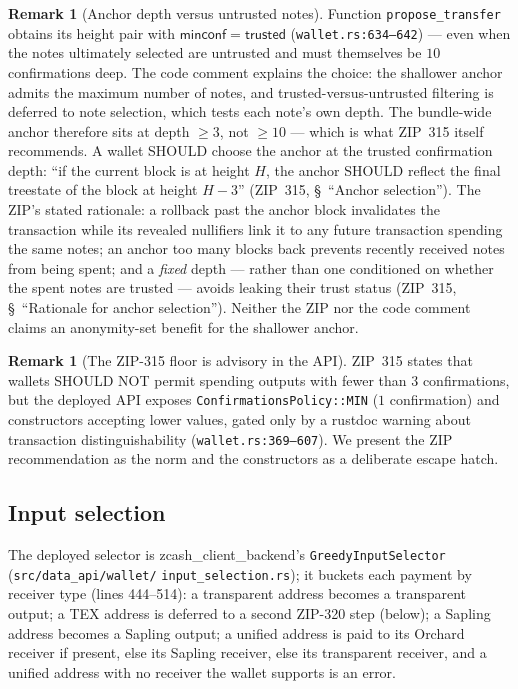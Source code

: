 \documentclass[11pt,a4paper]{article}
\theoremstyle{definition}
\newtheorem{remark}[theorem]{Remark}
\begin{document}
\begin{remark}[Anchor depth versus untrusted notes]\label{rem:anchor-depth}
Function \texttt{propose\_transfer} obtains its height pair with
$\mathsf{minconf} = \mathsf{trusted}$
(\texttt{wallet.rs:634--642}) --- even when the notes ultimately selected are
untrusted and must themselves be $10$ confirmations deep. The code comment
explains the choice: the shallower anchor admits the maximum number of notes,
and trusted-versus-untrusted filtering is deferred to note selection, which
tests each note's own depth. The bundle-wide anchor therefore sits at depth
$\ge 3$, not $\ge 10$ --- which is what ZIP~315 itself recommends. A wallet
SHOULD choose the anchor at the trusted confirmation depth: ``if the
current block is at height $H$, the anchor SHOULD reflect the final
treestate of the block at height $H-3$'' (ZIP~315, \S~``Anchor
selection''). The ZIP's stated rationale: a rollback past the anchor
block invalidates the transaction while its revealed nullifiers link it
to any future transaction spending the same notes; an anchor too many
blocks back prevents recently received notes from being spent; and a
\emph{fixed} depth --- rather than one conditioned on whether the spent
notes are trusted --- avoids leaking their trust status (ZIP~315,
\S~``Rationale for anchor selection''). Neither the ZIP nor the code
comment claims an anonymity-set benefit for the shallower anchor.
\end{remark}

\begin{remark}[The ZIP-315 floor is advisory in the API]\label{rem:zip315-min}
ZIP~315 states that wallets SHOULD NOT permit spending outputs with fewer
than $3$ confirmations, but the deployed API exposes
\texttt{ConfirmationsPolicy::MIN} ($1$ confirmation) and constructors
accepting lower values, gated only by a rustdoc warning about transaction
distinguishability (\texttt{wallet.rs:369--607}). We present the ZIP
recommendation as the norm and the constructors as a deliberate escape
hatch.
\end{remark}

\subsection{Input selection}\label{sec:pipeline-selection}

The deployed selector is \textsf{zcash\_client\_backend}'s
\texttt{GreedyInputSelector}
(\texttt{src/}\allowbreak\texttt{data\_api/}\allowbreak\texttt{wallet/}%
\allowbreak\texttt{input\_selection.rs}); it buckets each payment by
receiver type (lines 444--514): a transparent address becomes a transparent
output; a TEX address is deferred to a second ZIP-320 step (below); a Sapling
address becomes a Sapling output; a unified address is
paid to its Orchard receiver if present, else its Sapling receiver, else its
transparent receiver, and a unified address with no receiver the wallet
supports is an error.
\end{document}
